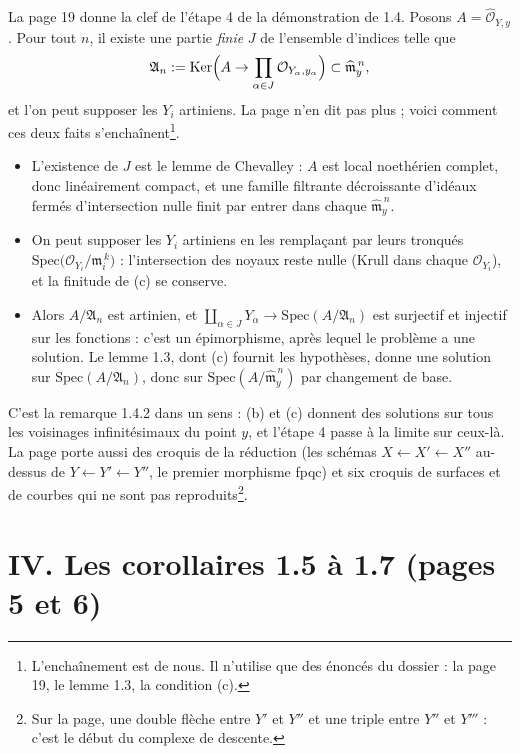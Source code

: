 \documentclass[11pt,a4paper]{article}
\begin{document}
La page 19 donne la clef de l'étape 4 de la démonstration de 1.4. Posons
$A = \widehat{\mathcal{O}}_{Y,y}$. Pour tout $n$, il existe une partie
\emph{finie} $J$ de l'ensemble d'indices telle que
\[
  \mathfrak{A}_n := \mathrm{Ker}\Bigl(A \to \prod_{\alpha \in J}
  \mathcal{O}_{Y_\alpha, y_\alpha}\Bigr) \subset \widehat{\mathfrak{m}}_y^{\,n} ,
\]
et l'on peut supposer les $Y_i$ artiniens. La page n'en dit pas plus ; voici
comment ces deux faits s'enchaînent\footnote{L'enchaînement est de nous. Il
n'utilise que des énoncés du dossier : la page 19, le lemme 1.3, la condition
(c).}.

\begin{itemize}
  \item L'existence de $J$ est le lemme de Chevalley : $A$ est local
  noethérien complet, donc linéairement compact, et une famille filtrante
  décroissante d'idéaux fermés d'intersection nulle finit par entrer dans
  chaque $\widehat{\mathfrak{m}}_y^{\,n}$.
  \item On peut supposer les $Y_i$ artiniens en les remplaçant par leurs
  tronqués $\mathrm{Spec}\bigl(\mathcal{O}_{Y_i}/\mathfrak{m}_i^{\,k}\bigr)$ :
  l'intersection des noyaux reste nulle (Krull dans chaque
  $\mathcal{O}_{Y_i}$), et la finitude de (c) se conserve.
  \item Alors $A/\mathfrak{A}_n$ est artinien, et
  $\coprod_{\alpha \in J} Y_\alpha \to \mathrm{Spec}(A/\mathfrak{A}_n)$ est
  surjectif et injectif sur les fonctions : c'est un épimorphisme, après
  lequel le problème a une solution. Le lemme 1.3, dont (c) fournit les
  hypothèses, donne une solution sur $\mathrm{Spec}(A/\mathfrak{A}_n)$, donc
  sur $\mathrm{Spec}(A/\widehat{\mathfrak{m}}_y^{\,n})$ par changement de base.
\end{itemize}

C'est la remarque 1.4.2 dans un sens : (b) et (c) donnent des solutions sur
tous les voisinages infinitésimaux du point $y$, et l'étape 4 passe à la
limite sur ceux-là. La page porte aussi des croquis de la réduction (les
schémas $X \leftarrow X' \leftarrow X''$ au-dessus de $Y \leftarrow Y'
\leftarrow Y''$, le premier morphisme fpqc) et six croquis de surfaces et de
courbes qui ne sont pas reproduits\footnote{Sur la page, une double flèche
entre $Y'$ et $Y''$ et une triple entre $Y''$ et $Y'''$ : c'est le début du
complexe de descente.}.

\section*{IV. Les corollaires 1.5 à 1.7 (pages 5 et 6)}
\end{document}

